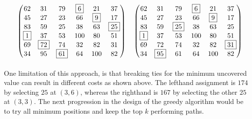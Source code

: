 \documentclass{article}
\begin{document}
\begin{equation*}
\quad
\begin{pmatrix}
62 & 31 & 79 & \fbox{6} & 21 & 37 \\
45 & 27 & 23 & 66 & \fbox{9} & 17 \\
83 & 59 & 25 & 38 & 63 & \fbox{25} \\
\fbox{1} & 37 & 53 & 100 & 80 & 51 \\
69 & \fbox{72} & 74 & 32 & 82 & 31 \\
34 & 95 & \fbox{61} & 64 & 100 & 82 \\
\end{pmatrix}
\quad
\begin{pmatrix}
62 & 31 & 79 & \fbox{6} & 21 & 37 \\
45 & 27 & 23 & 66 & \fbox{9} & 17 \\
83 & 59 & \fbox{25} & 38 & 63 & 25 \\
\fbox{1} & 37 & 53 & 100 & 80 & 51 \\
69 & 72 & 74 & 32 & 82 & \fbox{31} \\
34 & \fbox{95} & 61 & 64 & 100 & 82 \\
\end{pmatrix}
\end{equation*}

\paragraph{} One limitation of this approach, is that breaking ties for the minimum uncovered value can result in different costs as shown above. The lefthand assignment is $174$ by selecting $25$ at $(3, 6)$, whereas the righthand is $167$ by selecting the other $25$ at $(3, 3)$. The next progression in the design of the greedy algorithm would be to try all minimum positions and keep the top $k$ performing paths.
\end{document}
